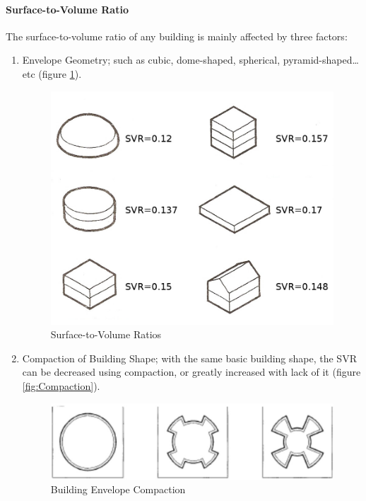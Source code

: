 \paragraph{Surface-to-Volume Ratio}\mbox{}

The surface-to-volume ratio of any building is mainly affected by three factors:

\begin{enumerate}
	\item Envelope Geometry; such as cubic, dome-shaped, spherical, pyramid-shaped\ldots{}etc (figure \ref{fig:SVR}).
		\begin{figure}[H]
			\centering
			\includegraphics[width=\textwidth]{./Images/3-SVR}
			\caption{Surface-to-Volume Ratios}
			\label{fig:SVR}
		\end{figure}
	\item Compaction of Building Shape; with the same basic building shape, the SVR can be decreased using compaction, or greatly increased with		  lack of it (figure \ref{fig:Compaction}).
		\begin{figure}[H]
			\centering
			\includegraphics[width=\textwidth]{./Images/4-Compaction}
			\caption{Building Envelope Compaction}

\end{figure}
\end{enumerate}
